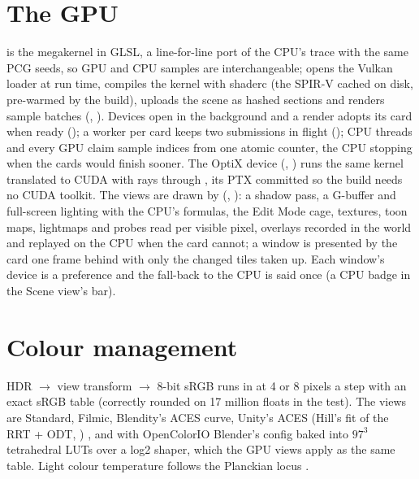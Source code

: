 \section{The GPU}
 is the megakernel in GLSL, a line-for-line port of the CPU's trace with the same PCG seeds,
so GPU and CPU samples are interchangeable;  opens the Vulkan loader at run time, compiles the
kernel with shaderc (the SPIR-V cached on disk, pre-warmed by the build), uploads the scene as hashed sections and
renders sample batches (, ). Devices open in the background and a render adopts its card when
ready (); a worker per card keeps two submissions in flight (); CPU threads and every GPU claim
sample indices from one atomic counter, the CPU stopping when the cards would finish sooner. The OptiX device
(, ) runs the same kernel translated to CUDA with rays through , its PTX committed
so the build needs no CUDA toolkit. The views are drawn by  (, ): a shadow pass,
a G-buffer and full-screen lighting with the CPU's formulas, the Edit Mode cage, textures, toon maps, lightmaps and
probes read per visible pixel, overlays recorded in the world and replayed on the CPU when the card cannot; a window is
presented by the card one frame behind with only the changed tiles taken up. Each window's device is a preference and
the fall-back to the CPU is said once (a CPU badge in the Scene view's bar).

\section{Colour management}
HDR $\to$ view transform $\to$ 8-bit sRGB runs in  at 4 or 8 pixels a step with an exact sRGB
table (correctly rounded on 17 million floats in the test). The views are Standard, Filmic, Blendity's ACES curve,
Unity's ACES (Hill's fit of the RRT + ODT, ) \cite{Hill2016ACES, ACES2026}, and with OpenColorIO Blender's
config baked into $97^3$ tetrahedral LUTs over a log2 shaper, which the GPU views apply as the same table.
Light colour temperature follows the Planckian locus \cite{Kang2002Design}.

